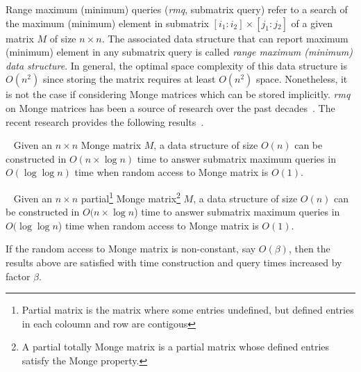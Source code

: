 Range maximum (minimum) que\-ries (\emph{rmq}, submatrix query) refer to a search of the maximum (minimum) element in submatrix $[i_{1}:i{_2}]\times [j_{1}:j{_2}]$ of a given matrix $M$ of size $n \times n$.
The associated data structure that can report maximum (minimum) element in any submatrix query is called \emph{range maximum (minimum) data structure}.
In general, the optimal space complexity of this data structure is $O(n^2)$ since storing the matrix requires at least $O(n^2)$ space.
Nonetheless, it is not the case if considering Monge matrices which can be stored implicitly.
\emph{rmq} on Monge matrices has been a source of research over the past decades~\cite{}.
The recent research provides the following results~\cite{.}.

\begin{theorem}~\cite{.}
Given an $n \times n$ Monge matrix $M$, a data structure of size $O(n)$ can be constructed in $O(n \times \log n)$ time to answer submatrix maximum queries in $O(\log \log n)$ time when random access to Monge matrix is $O(1)$.
\end{theorem}


\begin{theorem}~\cite{.}\label{partialTheorem}
  Given an $n \times n$ partial\footnote{Partial matrix is the matrix where some entries undefined, but defined entries in each coloumn and row are contigous} Monge matrix\footnote{A partial totally Monge matrix is a partial matrix whose defined entries satisfy the Monge property.} $M$, a data structure of size $O(n)$ can be constructed in $O(n \times \log n$) time to answer submatrix maximum queries in $O(\log \log n$) time when random access to Monge matrix is $O(1)$.
\end{theorem}

If the random access to Monge matrix is non-constant, say $O(\beta)$, then the results above are satisfied with time construction and query times increased by factor $\beta$.
  
